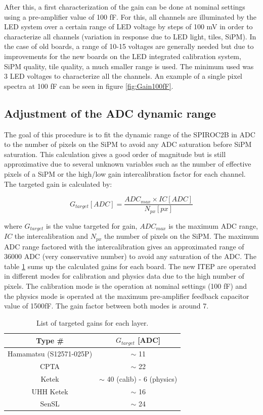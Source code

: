 After this, a first characterization of the gain can be done at nominal settings using a pre-amplifier value of 100 fF. For this, all channels are illuminated by the LED system over a certain range of LED voltage by steps of 100 mV in order to characterize all channels (variation in response due to LED light, tiles, SiPM). In the case of old boards, a range of 10-15 voltages are generally needed but due to improvements for the new boards on the LED integrated calibration system, SiPM quality, tile quality, a much smaller range is used. The minimum used was 3 LED voltages to characterize all the channels. An example of a single pixel spectra at 100 fF can be seen in figure \ref{fig:Gain100fF}.

\subsection{Adjustment of the ADC dynamic range}

The goal of this procedure is to fit the dynamic range of the SPIROC2B in ADC to the number of pixels on the SiPM to avoid any ADC saturation before SiPM saturation. This calculation gives a good order of magnitude but is still approximative due to several unknown variables such as the number of effective pixels of a SiPM or the high/low gain intercalibration factor for each channel. The targeted gain is calculated by:

\begin{equation}
  G_{target} [ADC] = \frac{ADC_{max} \times IC [ADC]}{N_{px} [px]}
\end{equation}

where $G_{target}$ is the value targeted for gain, $ADC_{max}$ is the maximum ADC range, $IC$ the intercalibration and $N_{px}$ the number of pixels on the SiPM. The maximum ADC range factored with the intercalibration gives an approximated range of 36000 ADC (very conservative number) to avoid any saturation of the ADC. The table \ref{table:GainTarget_SiPM} sums up the calculated gains for each board. The new ITEP are operated in different modes for calibration and physics data due to the high number of pixels. The calibration mode is the operation at nominal settings (100 fF) and the physics mode is operated at the maximum pre-amplifier feedback capacitor value of 1500fF. The gain factor between both modes is around 7.

\begin{table}[htb!]
  \centering
  \caption{List of targeted gains for each layer.}
  \label{table:GainTarget_SiPM}
  \begin{tabular}{@{} cc @{}}
    \hline
    Type \# & $G_{target}$ [ADC] \\
    \hline
    Hamamatsu (S12571-025P) & $\sim$ 11\\
    CPTA & $\sim$ 22\\
    Ketek & $\sim$ 40 (calib) - 6 (physics)\\
    UHH Ketek & $\sim$ 16\\
    SenSL & $\sim$ 24\\
    \hline
  \end{tabular}
\end{table}

